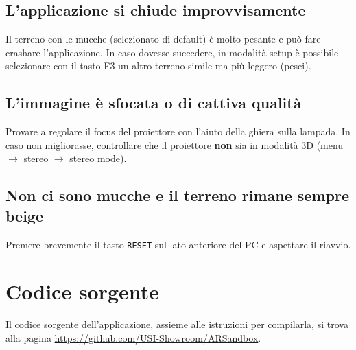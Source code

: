 \documentclass[12pt]{article}
\begin{document}
\subsection{L'applicazione si chiude improvvisamente}

Il terreno con le mucche (selezionato di default) è molto pesante e può fare crashare l'applicazione.
In caso dovesse succedere, in modalità setup è possibile selezionare con il tasto F3 un altro terreno simile
ma più leggero (pesci).

\subsection{L'immagine è sfocata o di cattiva qualità}

Provare a regolare il focus del proiettore con l'aiuto della ghiera sulla lampada. In caso non migliorasse, controllare
che il proiettore \textbf{non} sia in modalità 3D (menu $\rightarrow$ stereo $\rightarrow$ stereo mode).

\subsection{Non ci sono mucche e il terreno rimane sempre beige}

Premere brevemente il tasto \texttt{RESET} sul lato anteriore del PC e aspettare il riavvio.


\section{Codice sorgente}\label{sec:code}

Il codice sorgente dell'applicazione, assieme alle istruzioni per compilarla, si trova alla pagina \url{https://github.com/USI-Showroom/ARSandbox}.
\end{document}
